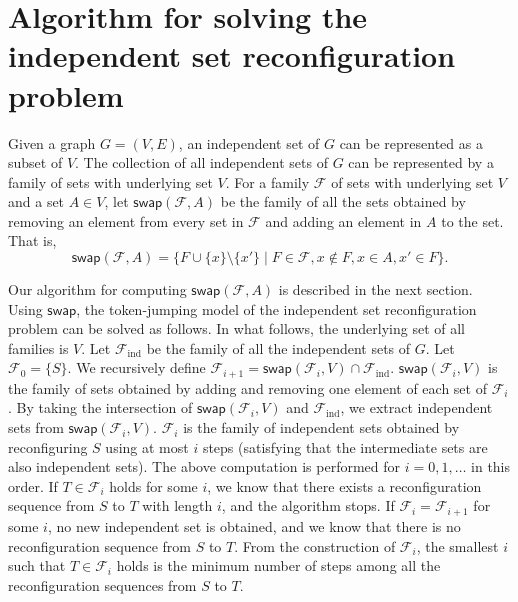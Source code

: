 \documentclass{article}
\begin{document}
\section{Algorithm for solving the independent set reconfiguration problem}

Given a graph $G = (V, E)$, an independent set of $G$ can be represented as a subset of $V$.
The collection of all independent sets of $G$ can be represented by a family of sets with underlying set $V$.
For a family $\mathcal{F}$ of sets with underlying set $V$ and a set $A \in V$,
let $\mathsf{swap}(\mathcal{F}, A)$ be the family of all the sets obtained by
removing an element from every set in $\mathcal{F}$
and adding an element in $A$ to the set. That is,
\begin{equation*}
  \mathsf{swap}(\mathcal{F}, A) = \{ F \cup \{x\} \setminus \{x'\}
      \mid F \in \mathcal{F},
      x \notin F, x \in A, x' \in F \}.
\end{equation*}

Our algorithm for computing $\mathsf{swap}(\mathcal{F}, A)$ is described in the next section.
Using $\mathsf{swap}$, the token-jumping model of the independent set reconfiguration problem can be solved as follows.
In what follows, the underlying set of all families is $V$.
Let $\mathcal{F}_{\mathrm{ind}}$ be the family of all the independent sets of $G$.
Let $\mathcal{F}_0 = \{S\}$.
We recursively define $\mathcal{F}_{i + 1} = \mathsf{swap}(\mathcal{F}_i, V) \cap \mathcal{F}_{\mathrm{ind}}$.
$\mathsf{swap}(\mathcal{F}_i, V)$ is the family of sets obtained by adding and removing one element of each set of $\mathcal{F}_i$.
By taking the intersection of $\mathsf{swap}(\mathcal{F}_i, V)$ and $\mathcal{F}_{\mathrm{ind}}$, 
we extract independent sets from $\mathsf{swap}(\mathcal{F}_i, V)$.
$\mathcal{F}_{i}$ is the family of independent sets obtained by reconfiguring $S$ using at most $i$ steps
(satisfying that the intermediate sets are also independent sets).
The above computation is performed for $i = 0, 1,\ldots$ in this order.
If $T \in \mathcal{F}_{i}$ holds for some $i$,
we know that there exists a reconfiguration sequence from $S$ to $T$ with length $i$, and the algorithm stops.
If $\mathcal{F}_{i} = \mathcal{F}_{i + 1}$ for some $i$,
no new independent set is obtained, and we know that there is no reconfiguration sequence from $S$ to $T$.
From the construction of $\mathcal{F}_{i}$,
the smallest $i$ such that $T \in \mathcal{F}_{i}$ holds is the minimum number of steps
among all the reconfiguration sequences from $S$ to $T$.
\end{document}
